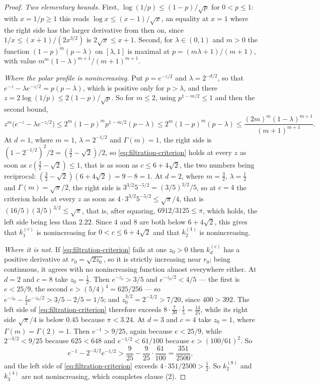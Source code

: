 \begin{proof}
\emph{Two elementary bounds.} First, $\log(1/p) \le (1-p)/\sqrt p$ for $0 < p \le 1$: with
$x = 1/p \ge 1$ this reads $\log x \le (x-1)/\sqrt x$, an equality at $x = 1$ where the right side
has the larger derivative from then on, since $1/x \le (x+1)/(2x^{3/2})$ is
$2\sqrt x \le x + 1$. Second, for $\lambda \in (0,1)$ and $m > 0$ the function
$(1-p)^m(p-\lambda)$ on $[\lambda,1]$ is maximal at $p = (m\lambda+1)/(m+1)$, with value
$m^m(1-\lambda)^{m+1}/(m+1)^{m+1}$.

\emph{Where the polar profile is nonincreasing.} Put $p = e^{-z/2}$ and $\lambda = 2^{-d/2}$, so
that $e^{-z} - \lambda e^{-z/2} = p(p-\lambda)$, which is positive only for $p > \lambda$, and
there $z = 2\log(1/p) \le 2(1-p)/\sqrt p$. So for $m \le 2$, using $p^{1-m/2} \le 1$ and then the
second bound,
\[
  z^m\bigl(e^{-z} - \lambda e^{-z/2}\bigr) \le 2^m(1-p)^m p^{1-m/2}(p-\lambda)
   \le 2^m(1-p)^m(p-\lambda) \le \frac{(2m)^m(1-\lambda)^{m+1}}{(m+1)^{m+1}} .
\]
At $d = 1$, where $m = 1$, $\lambda = 2^{-1/2}$ and $\Gamma(m) = 1$, the right side is
$(1-2^{-1/2})^2/2 = (\tfrac32-\sqrt2)/2$, so \ref{eq:filtration-criterion} holds at every $z$ as
soon as $c(\tfrac32-\sqrt2) \le 1$, that is as soon as $c \le 6 + 4\sqrt2$, the two numbers being
reciprocal: $(\tfrac32-\sqrt2)(6+4\sqrt2) = 9 - 8 = 1$. At $d = 2$, where $m = \tfrac32$,
$\lambda = \tfrac12$ and $\Gamma(m) = \sqrt\pi/2$, the right side is
$3^{3/2}5^{-5/2} = (3/5)^{3/2}/5$, so at $c = 4$ the criterion holds at every $z$ as soon as
$4\cdot 3^{3/2}5^{-5/2} \le \sqrt\pi/4$, that is $(16/5)(3/5)^{3/2} \le \sqrt\pi$, that is, after
squaring, $6912/3125 \le \pi$, which holds, the left side being less than $2.22$. Since $4$ and
$8$ are both below $6+4\sqrt2$, this gives that $k^{(c)}_1$ is nonincreasing for
$0 < c \le 6+4\sqrt2$ and that $k^{(4)}_2$ is nonincreasing.

\emph{Where it is not.} If \ref{eq:filtration-criterion} fails at one $z_0 > 0$ then $k^{(c)}_d$
has a positive derivative at $r_0 = \sqrt{2z_0}$, so it is strictly increasing near $r_0$; being
continuous, it agrees with no nonincreasing function almost everywhere either. At $d = 2$ and
$c = 8$ take $z_0 = \tfrac12$. Then $e^{-z_0} > 3/5$ and $e^{-z_0/2} < 4/5$ --- the first is
$e < 25/9$, the second $e > (5/4)^4 = 625/256$ --- so
$e^{-z_0} - \tfrac12 e^{-z_0/2} > 3/5 - 2/5 = 1/5$; and $z_0^{3/2} = 2^{-3/2} > 7/20$, since
$400 > 392$. The left side of \ref{eq:filtration-criterion} therefore exceeds
$8 \cdot \tfrac7{20} \cdot \tfrac15 = \tfrac{14}{25}$, while its right side $\sqrt\pi/4$ is below
$0.45$ because $\pi < 3.24$. At $d = 3$ and $c = 4$ take $z_0 = 1$, where
$\Gamma(m) = \Gamma(2) = 1$. Then $e^{-1} > 9/25$, again because $e < 25/9$, while
$2^{-3/2} < 9/25$ because $625 < 648$ and $e^{-1/2} < 61/100$ because $e > (100/61)^2$. So
\[
  e^{-1} - 2^{-3/2}e^{-1/2} > \frac9{25} - \frac9{25}\cdot\frac{61}{100} = \frac{351}{2500} ,
\]
and the left side of \ref{eq:filtration-criterion} exceeds $4\cdot 351/2500 > \tfrac12$. So
$k^{(8)}_2$ and $k^{(4)}_3$ are not nonincreasing, which completes clause (2).


\end{proof}
